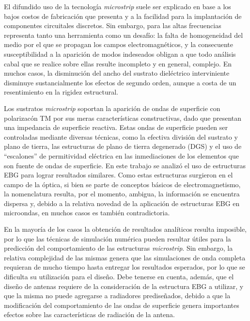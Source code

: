 

El difundido uso de la tecnología \textit{microstrip} suele ser explicado en base a los bajos costos de fabricación que presenta y a la facilidad para la implantación de componentes circuitales discretos. Sin embargo, para las altas frecuencias representa tanto una herramienta como un desafío: la falta de homogeneidad del medio por el que se propagan los campos electromagnéticos, y la consecuente susceptibilidad a la aparición de modos indeseados obligan a que todo análisis cabal que se realice sobre ellas resulte incompleto y en general, complejo. En muchos casos, la disminución del ancho del sustrato dieléctrico interviniente disminuye sustancialmente los efectos de segundo orden, aunque a costa de un resentimiento en la rigidez estructural.

Los sustratos \textit{microstrip} soportan la aparición de ondas de superficie con polarizacón TM por sus meras características constructivas, dado que presentan una impedancia de superficie reactiva. Estas ondas de superficie pueden ser controladas mediante diversas técnicas, como la efectiva división del sustrato y plano de tierra, las estructuras de plano de tierra degenerado (DGS) y el uso de \enquote{escalones} de permitividad eléctrica en las inmediaciones de los elementos que son fuente de ondas de superficie. En este trabajo se analizó el uso de estructuras EBG para lograr resultados similares. Como estas estructuras surgieron en el campo de la óptica, si bien se parte de conceptos básicos de electromagnetismo, la nomenclatura resulta, por el momento, ambigua, la información se encuentra dispersa y, debido a la relativa novedad de la aplicación de estructuras EBG en microondas, en muchos casos es también contradictoria.

En la mayoría de los casos la obtención de resultados analíticos resulta imposible, por lo que las técnicas de simulación numérica pueden resultar útiles para la predicción del comportamiento de las estructuras \textit{microstrip}. Sin embargo, la relativa complejidad de las mismas genera que las simulaciones de onda completa requieran de mucho tiempo hasta entregar los resultados esperados, por lo que se dificulta su utilización para el diseño. Debe tenerse en cuenta, además, que el diseño de antenas requiere de la consideración de la estructura EBG a utilizar, y que la misma no puede agregarse a radiadores prediseñados, debido a que la modificación del comportamiento de las ondas de superficie genera importantes efectos sobre las características de radiación de la antena.

